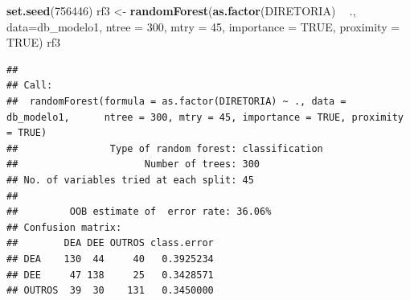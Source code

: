 \documentclass[]{article}
\newenvironment{Shaded}{\begin{snugshade}}{\end{snugshade}}
\newcommand{\KeywordTok}[1]{\textcolor[rgb]{0.13,0.29,0.53}{\textbf{#1}}}
\newcommand{\DataTypeTok}[1]{\textcolor[rgb]{0.13,0.29,0.53}{#1}}
\newcommand{\DecValTok}[1]{\textcolor[rgb]{0.00,0.00,0.81}{#1}}
\newcommand{\StringTok}[1]{\textcolor[rgb]{0.31,0.60,0.02}{#1}}
\newcommand{\CommentTok}[1]{\textcolor[rgb]{0.56,0.35,0.01}{\textit{#1}}}
\newcommand{\OtherTok}[1]{\textcolor[rgb]{0.56,0.35,0.01}{#1}}
\newcommand{\OperatorTok}[1]{\textcolor[rgb]{0.81,0.36,0.00}{\textbf{#1}}}
\newcommand{\NormalTok}[1]{#1}
\begin{document}
\begin{Shaded}
\end{Shaded}

\begin{Shaded}
\begin{Highlighting}[]
\KeywordTok{set.seed}\NormalTok{(}\DecValTok{756446}\NormalTok{)}
\NormalTok{rf3 <-}\StringTok{ }\KeywordTok{randomForest}\NormalTok{(}\KeywordTok{as.factor}\NormalTok{(DIRETORIA) }\OperatorTok{~}\StringTok{ }\NormalTok{., }\DataTypeTok{data=}\NormalTok{db_modelo1,}
                    \DataTypeTok{ntree =} \DecValTok{300}\NormalTok{,}
                    \DataTypeTok{mtry =} \DecValTok{45}\NormalTok{,}
                    \DataTypeTok{importance =} \OtherTok{TRUE}\NormalTok{,}
                    \DataTypeTok{proximity =} \OtherTok{TRUE}\NormalTok{)}
\NormalTok{rf3}
\end{Highlighting}
\end{Shaded}

\begin{verbatim}
## 
## Call:
##  randomForest(formula = as.factor(DIRETORIA) ~ ., data = db_modelo1,      ntree = 300, mtry = 45, importance = TRUE, proximity = TRUE) 
##                Type of random forest: classification
##                      Number of trees: 300
## No. of variables tried at each split: 45
## 
##         OOB estimate of  error rate: 36.06%
## Confusion matrix:
##        DEA DEE OUTROS class.error
## DEA    130  44     40   0.3925234
## DEE     47 138     25   0.3428571
## OUTROS  39  30    131   0.3450000
\end{verbatim}

\begin{Shaded}
\end{Shaded}
\end{document}
